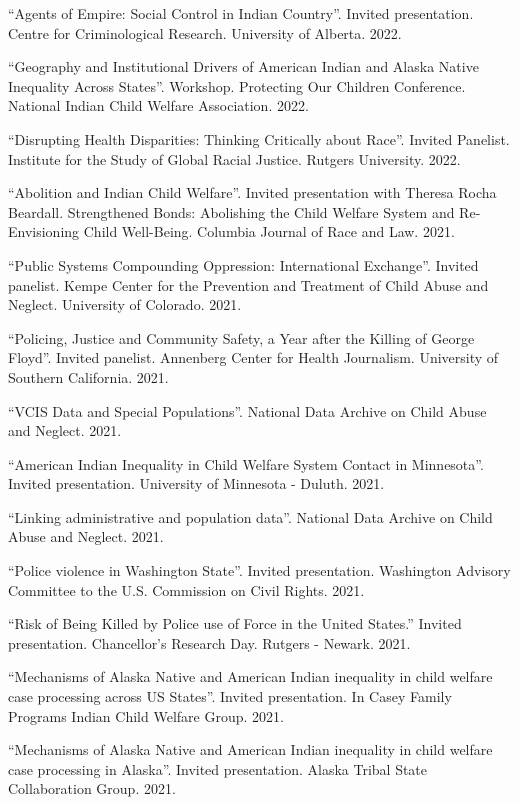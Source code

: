\documentclass[margin,line]{res}
\begin{document}
\begin{resume}
``Agents of Empire: Social Control in Indian Country''. Invited presentation. Centre for Criminological Research. University of Alberta. 2022.

``Geography and Institutional Drivers of American Indian and Alaska Native Inequality Across States''. Workshop. Protecting Our Children Conference. National Indian Child Welfare Association. 2022.

``Disrupting Health Disparities: Thinking Critically about Race''. Invited Panelist. Institute for the Study of Global Racial Justice. Rutgers University. 2022.

``Abolition and Indian Child Welfare''. Invited presentation with Theresa Rocha Beardall. Strengthened Bonds: Abolishing the Child Welfare System and Re-Envisioning Child Well-Being. Columbia Journal of Race and Law. 2021.

``Public Systems Compounding Oppression: International Exchange''. Invited panelist. Kempe Center for the Prevention and Treatment of Child Abuse and Neglect. University of Colorado. 2021.

``Policing, Justice and Community Safety, a Year after the Killing of George Floyd''. Invited panelist. Annenberg Center for Health Journalism. University of Southern California. 2021.

``VCIS Data and Special Populations''. National Data Archive on Child Abuse and Neglect. 2021.

``American Indian Inequality in Child Welfare System Contact in Minnesota''. Invited presentation. University of Minnesota - Duluth. 2021.

``Linking administrative and population data''. National Data Archive on Child Abuse and Neglect. 2021.

``Police violence in Washington State''. Invited presentation. Washington Advisory Committee to the U.S. Commission on Civil Rights. 2021.

``Risk of Being Killed by Police use of Force in the United States.'' Invited presentation. Chancellor's Research Day. Rutgers - Newark. 2021.

``Mechanisms of Alaska Native and American Indian inequality in child welfare case processing across US States''. Invited presentation. In Casey Family Programs Indian Child Welfare Group. 2021.

``Mechanisms of Alaska Native and American Indian inequality in child welfare case processing in Alaska''. Invited presentation. Alaska Tribal State Collaboration Group. 2021.


\end{resume}
\end{document}
